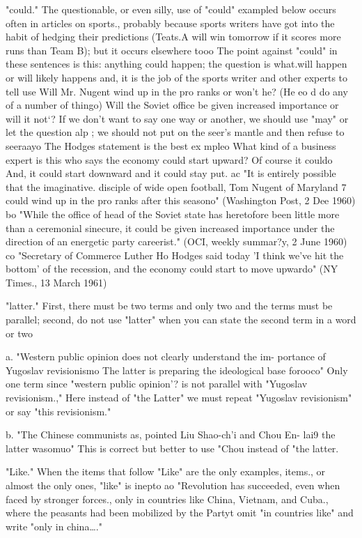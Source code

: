 \documentclass[
    oneside,
    11pt,
    draft
]{memoir}
\begin{document}
"could." The questionable, or even silly, use of "could" exampled below occurs often in articles on sports., probably because sports writers have got into the habit of hedging their predictions (Teats.A will win tomorrow if it scores more runs than Team B); but it occurs elsewhere tooo The point against "could" in these sentences is this: anything could happen; the question is what.will happen or will likely happens and, it is the job of the sports writer and other experts to tell use Will Mr. Nugent wind up in the pro ranks or won't he? (He eo d do any of a number of thingo) Will the Soviet office be given increased importance or will it not`? If we don't want to say one way or another, we should use "may" or let the question alp ; we should not put on the seer's mantle and then refuse to seeraayo The Hodges statement is the best ex mpleo What kind of a business expert is this who says the economy could start upward? Of course it couldo And, it could start downward and it could stay put. ac "It is entirely possible that the imaginative. disciple of wide open football, Tom Nugent of Maryland 7 could wind up in the pro ranks after this seasono" (Washington Post, 2 Dee 1960) bo "While the office of head of the Soviet state has heretofore been little more than a ceremonial sinecure, it could be given increased importance under the direction of an energetic party careerist." (OCI, weekly summar?y, 2 June 1960) co "Secretary of Commerce Luther Ho Hodges said today 'I think we've hit the bottom' of the recession, and the economy could start to move upwardo" (NY Times., 13 March 1961) 

"latter." First, there must be two terms and only two and the terms must be parallel; second, do not use "latter" when you can state the second term in a word or two 

a. "Western public opinion does not clearly understand the im- portance of Yugoslav revisionismo The latter is preparing the ideological base forooco" Only one term since "western public opinion'? is not parallel with "Yugoslav revisionism.," Here instead of "the Latter" we must repeat "Yugoslav revisionism" or say "this revisionism." 

b. "The Chinese communists as, pointed Liu Shao-ch'i and Chou En- lai9 the latter wasomuo" This is correct but better to use "Chou instead of "the latter. 

"Like." When the items that follow "Like" are the only examples, items., or almost the only ones, "like" is inepto ao "Revolution has succeeded, even when faced by stronger forces., only in countries like China, Vietnam, and Cuba., where the peasants had been mobilized by the Partyt omit "in countries like" and write "only in china\dots." 
\end{document}
